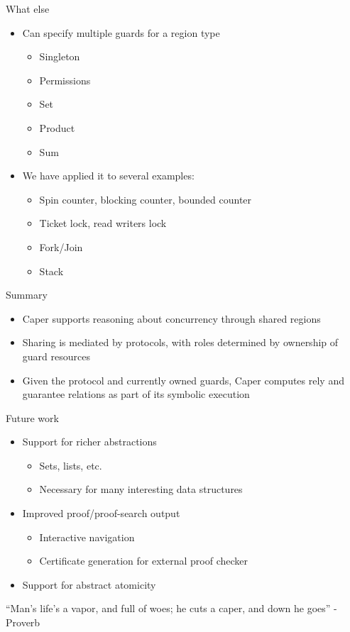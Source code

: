 \documentclass[sans,mathserif,dvipsnames]{beamer}
\begin{document}
\begin{frame}{What else}
  \begin{itemize}
    \item Can specify multiple guards for a region type
    \begin{itemize}
      \item Singleton
      \item Permissions
      \item Set
      \item Product
      \item Sum
    \end{itemize}
    \item We have applied it to several examples:
    \begin{itemize}
      \item Spin counter, blocking counter, bounded counter
      \item Ticket lock, read writers lock
      \item Fork/Join
      \item Stack
    \end{itemize}
  \end{itemize}
\end{frame}

\begin{frame}{Summary}
 \begin{itemize}
    \item Caper supports reasoning about concurrency through shared regions
    \item Sharing is mediated by protocols, with roles determined by ownership of guard resources
    \item Given the protocol and currently owned guards, Caper computes rely and guarantee relations as part of its symbolic execution
  \end{itemize}
\end{frame}

\begin{frame}{Future work}
  \begin{itemize}
    \item Support for richer abstractions
      \begin{itemize}
        \item Sets, lists, etc.
        \item Necessary for many interesting data structures
      \end{itemize}
    \item Improved proof/proof-search output
      \begin{itemize}
        \item Interactive navigation
        \item Certificate generation for external proof checker
      \end{itemize}
    \item Support for abstract atomicity
  \end{itemize}
\end{frame}

\begin{frame}
``Man's life's a vapor, and full of woes; he cuts a caper, and down he goes'' - Proverb
\end{frame}
\end{document}
